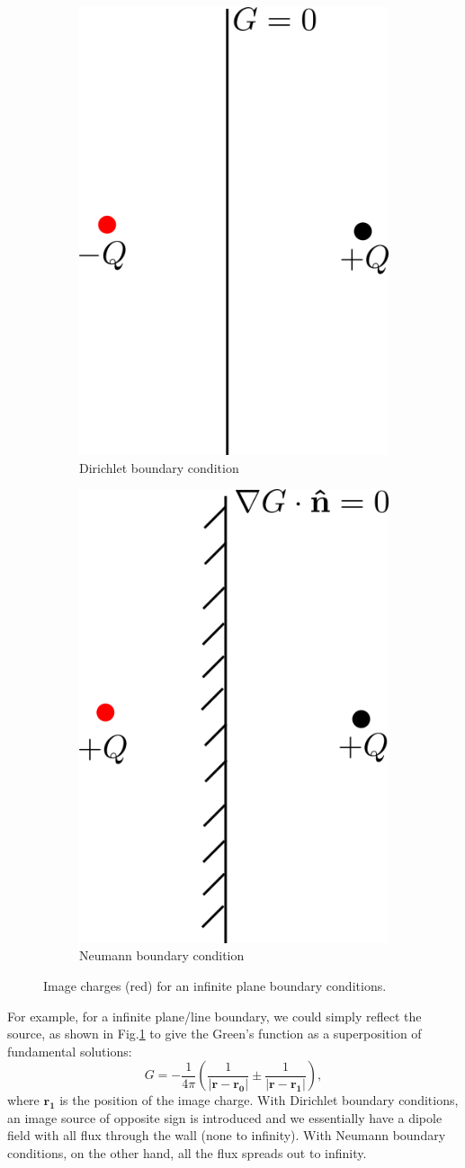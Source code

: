 \documentclass{article}
\begin{document}
\begin{figure}[ht]
    \centering
    \begin{subfigure}{.5\textwidth}
      \centering
      \includegraphics[width=.4\linewidth]{figs/chap3_image_point_dirichlet.png}
      \caption{Dirichlet boundary condition}
    \end{subfigure}%
    \begin{subfigure}{.5\textwidth}
      \centering
      \includegraphics[width=.4\linewidth]{figs/chap3_image_point_neumann.png}
      \caption{Neumann boundary condition}
    \end{subfigure}
    \caption{Image charges (red) for an infinite plane boundary conditions.}
    \label{fig:chap3-image-plane}
    \end{figure}

For example, for a infinite plane/line boundary, we could simply reflect the source, as shown in Fig.\ref{fig:chap3-image-plane} to give the Green's function as a superposition of fundamental solutions:
\[
    G = -\frac{1}{4\pi }\left( \frac{1}{\left\vert \mathbf{r} - \mathbf{r_0}  \right\vert } \pm \frac{1}{\left\vert \mathbf{r} - \mathbf{r_1}  \right\vert }\right),
\]
where $\mathbf{r_1}$ is the position of the image charge. With Dirichlet boundary conditions, an image source of opposite sign is introduced and we essentially have a dipole field with all flux through the wall (none to infinity). With Neumann boundary conditions, on the other hand, all the flux spreads out to infinity.
\end{document}
